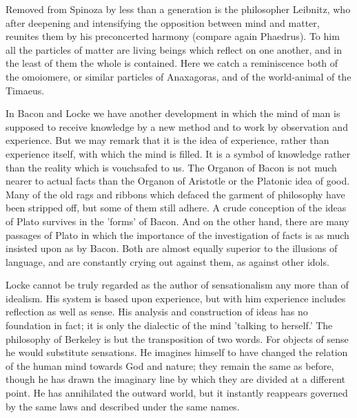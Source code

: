 \documentclass[11pt,letter]{article}
\begin{document}
\par  Removed from Spinoza by less than a generation is the philosopher Leibnitz, who after deepening and intensifying the opposition between mind and matter, reunites them by his preconcerted harmony (compare again Phaedrus). To him all the particles of matter are living beings which reflect on one another, and in the least of them the whole is contained. Here we catch a reminiscence both of the omoiomere, or similar particles of Anaxagoras, and of the world-animal of the Timaeus.

\par  In Bacon and Locke we have another development in which the mind of man is supposed to receive knowledge by a new method and to work by observation and experience. But we may remark that it is the idea of experience, rather than experience itself, with which the mind is filled. It is a symbol of knowledge rather than the reality which is vouchsafed to us. The Organon of Bacon is not much nearer to actual facts than the Organon of Aristotle or the Platonic idea of good. Many of the old rags and ribbons which defaced the garment of philosophy have been stripped off, but some of them still adhere. A crude conception of the ideas of Plato survives in the 'forms' of Bacon. And on the other hand, there are many passages of Plato in which the importance of the investigation of facts is as much insisted upon as by Bacon. Both are almost equally superior to the illusions of language, and are constantly crying out against them, as against other idols.

\par  Locke cannot be truly regarded as the author of sensationalism any more than of idealism. His system is based upon experience, but with him experience includes reflection as well as sense. His analysis and construction of ideas has no foundation in fact; it is only the dialectic of the mind 'talking to herself.' The philosophy of Berkeley is but the transposition of two words. For objects of sense he would substitute sensations. He imagines himself to have changed the relation of the human mind towards God and nature; they remain the same as before, though he has drawn the imaginary line by which they are divided at a different point. He has annihilated the outward world, but it instantly reappears governed by the same laws and described under the same names.
\end{document}
